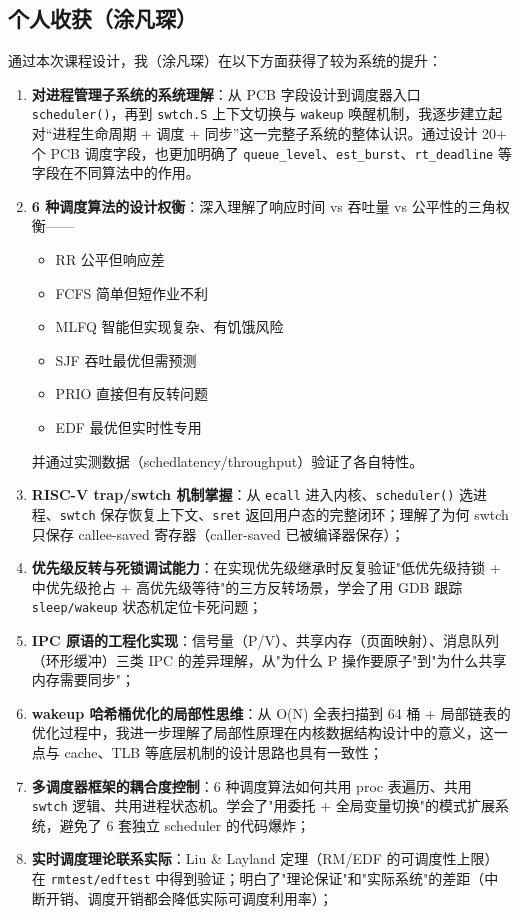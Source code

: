 \documentclass[12pt,a4paper]{ctexart}
\begin{document}
\subsection{个人收获（涂凡琛）}

通过本次课程设计，我（涂凡琛）在以下方面获得了较为系统的提升：

\begin{enumerate}
  \item \textbf{对进程管理子系统的系统理解}：从 PCB 字段设计到调度器入口 \texttt{scheduler()}，再到 \texttt{swtch.S} 上下文切换与 \texttt{wakeup} 唤醒机制，我逐步建立起对“进程生命周期 + 调度 + 同步”这一完整子系统的整体认识。通过设计 20+ 个 PCB 调度字段，也更加明确了 \texttt{queue\_level}、\texttt{est\_burst}、\texttt{rt\_deadline} 等字段在不同算法中的作用。
  \item \textbf{6 种调度算法的设计权衡}：深入理解了响应时间 vs 吞吐量 vs 公平性的三角权衡——
    \begin{itemize}
      \item RR 公平但响应差
      \item FCFS 简单但短作业不利
      \item MLFQ 智能但实现复杂、有饥饿风险
      \item SJF 吞吐最优但需预测
      \item PRIO 直接但有反转问题
      \item EDF 最优但实时性专用
    \end{itemize}
    并通过实测数据（schedlatency/throughput）验证了各自特性。
  \item \textbf{RISC-V trap/swtch 机制掌握}：从 \texttt{ecall} 进入内核、\texttt{scheduler()} 选进程、\texttt{swtch} 保存恢复上下文、\texttt{sret} 返回用户态的完整闭环；理解了为何 swtch 只保存 callee-saved 寄存器（caller-saved 已被编译器保存）；
  \item \textbf{优先级反转与死锁调试能力}：在实现优先级继承时反复验证"低优先级持锁 + 中优先级抢占 + 高优先级等待"的三方反转场景，学会了用 GDB 跟踪 \texttt{sleep/wakeup} 状态机定位卡死问题；
  \item \textbf{IPC 原语的工程化实现}：信号量（P/V）、共享内存（页面映射）、消息队列（环形缓冲）三类 IPC 的差异理解，从"为什么 P 操作要原子"到"为什么共享内存需要同步"；
  \item \textbf{wakeup 哈希桶优化的局部性思维}：从 O(N) 全表扫描到 64 桶 + 局部链表的优化过程中，我进一步理解了局部性原理在内核数据结构设计中的意义，这一点与 cache、TLB 等底层机制的设计思路也具有一致性；
  \item \textbf{多调度器框架的耦合度控制}：6 种调度算法如何共用 proc 表遍历、共用 \texttt{swtch} 逻辑、共用进程状态机。学会了"用委托 + 全局变量切换"的模式扩展系统，避免了 6 套独立 scheduler 的代码爆炸；
  \item \textbf{实时调度理论联系实际}：Liu \& Layland 定理（RM/EDF 的可调度性上限）在 \texttt{rmtest/edftest} 中得到验证；明白了"理论保证"和"实际系统"的差距（中断开销、调度开销都会降低实际可调度利用率）；
\end{enumerate}
\end{document}
